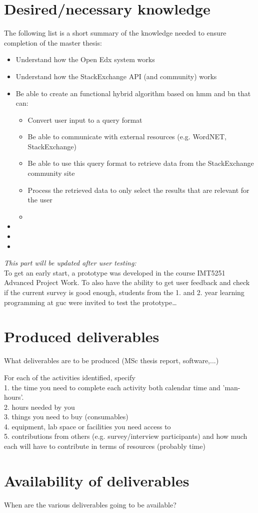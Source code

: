 \section{Desired/necessary knowledge}
\label{chapter5:desired_knowledge}
The following list is a short summary of the knowledge needed to ensure completion of the master thesis:
\begin{itemize}
	\item Understand how the Open Edx system works
	\item Understand how the StackExchange API (and community) works
	\item Be able to create an functional hybrid algorithm based on \gls{hmm} and \gls{bn} that can:
	\begin{itemize}
		\item Convert user input to a query format
		\item Be able to communicate with external resources (e.g. WordNET, StackExchange)
		\item Be able to use this query format to retrieve data from the StackExchange community site
		\item Process the retrieved data to only select the results that are relevant for the user
		\item 
	\end{itemize}
	\item 
	\item 
	\item 
\end{itemize}

\emph{This part will be updated after user testing:} \\
To get an early start, a prototype was developed in the course IMT5251 Advanced Project Work. To also have the ability to get user feedback and check if the current survey is good enough, students from the 1. and 2. year learning programming at \gls{guc} were invited to test the prototype\ldots 

\section{Produced deliverables}
\label{chapter5:produced_deliverables}

What deliverables are to be produced (MSc thesis report, software,...)

For each of the activities identified, specify \\
	1. the time you need to complete each activity both calendar time and 'man-hours'.  \\
	2. hours needed by you \\ 
	3. things you need to buy (consumables) \\
	4. equipment, lab space or facilities you need access to \\
	5. contributions from others (e.g. survey/interview participants) and how much each will have to contribute in terms of resources (probably time)

\section{Availability of deliverables}
\label{chapter5:availability_deliverables}

When are the various deliverables going to be available?
